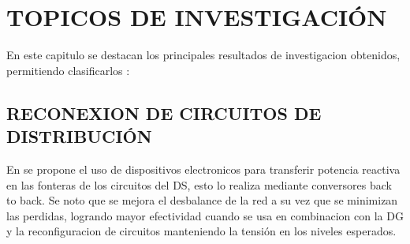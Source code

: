 \documentclass[12pt, letterpaper]{report}
\begin{document}

\chapter{TOPICOS  DE INVESTIGACIÓN}
En este capitulo se destacan los principales resultados de investigacion obtenidos, permitiendo clasificarlos :\\
\section{RECONEXION DE CIRCUITOS DE DISTRIBUCIÓN}
En \cite{Cao2016} se propone el uso de dispositivos electronicos para transferir potencia reactiva en las fonteras de los circuitos del DS, esto lo realiza mediante conversores back to back. Se noto que se mejora el desbalance de la red a su vez que se minimizan las perdidas, logrando mayor efectividad cuando se usa en combinacion con la DG y la reconfiguracion de circuitos manteniendo la tensión en los niveles esperados.\\
\end{document}
